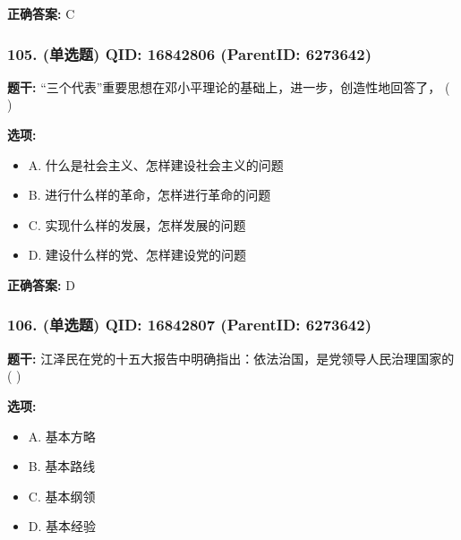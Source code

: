 \documentclass[12pt,UTF8]{ctexart}
\begin{document}
\textbf{正确答案:}
C

\vspace{0.3em}\hrulefill\vspace{0.7em}

\subsubsection*{105. (单选题) \small QID: 16842806 (ParentID: 6273642)}

\textbf{题干:}
“三个代表”重要思想在邓小平理论的基础上，进一步，创造性地回答了， ( )



\textbf{选项:}
\begin{itemize}[leftmargin=*]

  \item A. 什么是社会主义、怎样建设社会主义的问题

  \item B. 进行什么样的革命，怎样进行革命的问题

  \item C. 实现什么样的发展，怎样发展的问题

  \item D. 建设什么样的党、怎样建设党的问题

\end{itemize}

\textbf{正确答案:}
D

\vspace{0.3em}\hrulefill\vspace{0.7em}

\subsubsection*{106. (单选题) \small QID: 16842807 (ParentID: 6273642)}

\textbf{题干:}
江泽民在党的十五大报告中明确指出：依法治国，是党领导人民治理国家的 ( )



\textbf{选项:}
\begin{itemize}[leftmargin=*]

  \item A. 基本方略

  \item B. 基本路线

  \item C. 基本纲领

  \item D. 基本经验

\end{itemize}
\end{document}
